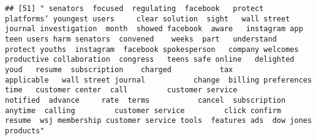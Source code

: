 \documentclass[
]{article}
\begin{document}
\begin{verbatim}
## [51] " senators  focused  regulating  facebook   protect  platforms’ youngest users     clear solution  sight   wall street journal investigation  month  showed facebook  aware   instagram app    teen users harm senators  convened    weeks  part   understand   protect youths  instagram  facebook spokesperson   company welcomes productive collaboration  congress   teens safe online   delighted  youd   resume  subscription    charged           tax          applicable   wall street journal           change  billing preferences   time   customer center  call         customer service            notified  advance     rate  terms           cancel  subscription  anytime  calling         customer service         click confirm  resume  wsj membership customer service tools  features ads  dow jones products"                                                                                                                                                                                                                                                                                                                                                                                                                                                                                                                                                                                                                                                                                                                                                                                                                                                                                                                                                                                                                                                                                                                                                                                                                                                                                                                                                                                                                                                                                                                                                                                                                                                                                                                                                                                                                                                                                                                                                                                                                                                                                                                                                                                                                                                                                                                                                                                                                                                                                                                                                                                                            
\end{verbatim}
\end{document}
